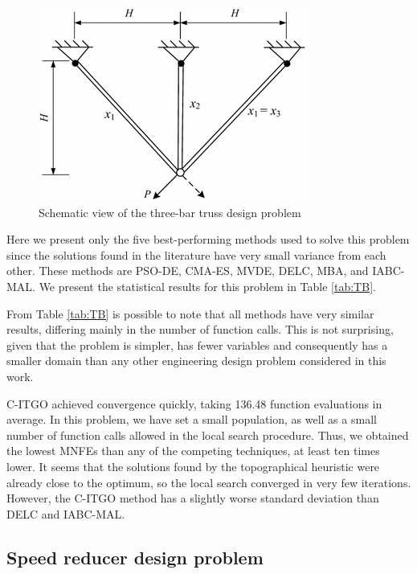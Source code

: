 \begin{figure}[h]
\begin{center}
\includegraphics[scale=0.5]{Imgs/TB.png}
\end{center}
\captionsetup{justification=centering}
\caption{Schematic view of the three-bar truss design problem}\label{fig:TB}
\end{figure}


Here we present only the five best-performing methods used to solve this problem since the solutions found in the literature have very small variance from each other. These methods are PSO-DE, CMA-ES, MVDE, DELC, MBA, and IABC-MAL. We present the statistical results for this problem in Table \ref{tab:TB}.



From Table \ref{tab:TB} is possible to note that all methods have very similar results, differing mainly in the number of function calls. This is not surprising, given that the problem is simpler, has fewer variables and consequently has a smaller domain than any other engineering design problem considered in this work.

C-ITGO achieved convergence quickly, taking 136.48 function evaluations in average. In this problem, we have set a small population, as well as a small number of function calls allowed in the local search procedure. Thus, we obtained the lowest MNFEs than any of the competing techniques, at least ten times lower. It seems that the solutions found by the topographical heuristic were already close to the optimum, so the local search converged in very few iterations. However, the C-ITGO method has a slightly worse standard deviation than DELC and IABC-MAL.



\subsection{Speed reducer design problem}

